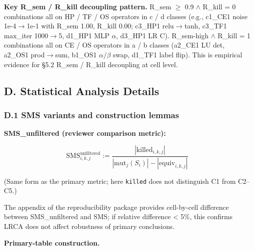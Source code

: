 \documentclass[review,12pt,authoryear]{elsarticle}
\begin{document}
\textbf{Key R\_sem / R\_kill decoupling pattern.} R\_sem $\geq$ 0.9 $\wedge$ R\_kill
= 0 combinations all on HP / TF / OS operators in c / d classes (e.g.,
c1\_CE1 noise 1e-4$\to$1e-1 with R\_sem 1.00, R\_kill 0.00; c3\_HP1
relu$\to$tanh, c3\_TF1 max\_iter 1000$\to$5, d1\_HP1 MLP $\alpha$, d3\_HP1 LR C).
R\_sem-high $\wedge$ R\_kill = 1 combinations all on CE / OS operators in a / b
classes (a2\_CE1 LU det, a2\_OS1 prod$\to$sum, b1\_OS1 $\alpha$/$\beta$ swap, d1\_TF1
label flip). This is empirical evidence for §5.2 R\_sem / R\_kill
decoupling at cell level.


\subsection{D. Statistical Analysis Details}\label{d.-statistical-analysis-details}

\subsubsection{D.1 SMS variants and construction lemmas}\label{d.1-sms-variants-and-construction-lemmas}

\textbf{SMS\_unfiltered (reviewer comparison metric):}

\[
\mathrm{SMS}^{\mathrm{unfiltered}}_{i,k,j} := \frac{|\mathrm{killed}_{i,k,j}|}{|\mathrm{mut}_j(S_i)| - |\mathrm{equiv}_{i,k,j}|}
\]

(Same form as the primary metric; here \texttt{killed} does not distinguish C1 from C2--C5.)

The appendix of the reproducibility package provides cell-by-cell
difference between SMS\_unfiltered and SMS; if relative difference
\textless{} 5\%, this confirms LRCA does not affect robustness of
primary conclusions.

\textbf{Primary-table construction.}
\end{document}
